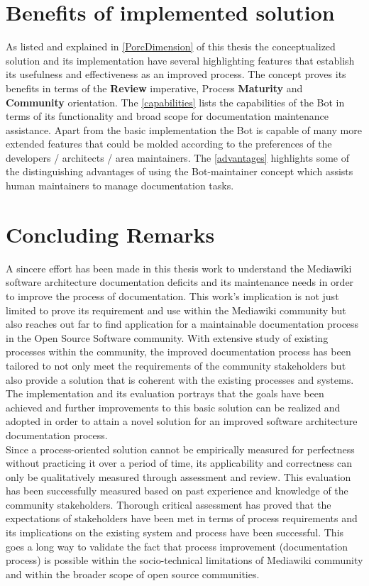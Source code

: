 \section{Benefits of implemented solution} 
\indent As listed and explained in \autoref{PorcDimension} of this thesis the conceptualized solution and its implementation have several highlighting features that establish its usefulness and effectiveness as an improved process. The concept proves its benefits in terms of the \textbf{Review} imperative, Process \textbf{Maturity} and \textbf{Community} orientation.
\newline \newline The \autoref{capabilities} lists the capabilities of the Bot in terms of its functionality and broad scope for documentation maintenance assistance. Apart from the basic implementation the Bot is capable of many more extended features that could be molded according to the preferences of the developers / architects / area maintainers. 	
\newline \newline The \autoref{advantages} highlights some of the distinguishing advantages of using the Bot-maintainer concept which assists human maintainers to manage documentation tasks.

\section{Concluding Remarks} 	
\indent A sincere effort has been made in this thesis work to understand the Mediawiki software architecture documentation deficits and its maintenance needs in order to improve the process of documentation. This work's implication is not just limited to prove its requirement and use within the Mediawiki community but also reaches out far to find application for a maintainable documentation process in the Open Source Software community. With extensive study of existing processes within the community, the improved documentation process has been tailored to not only meet the requirements of the community stakeholders but also provide a solution that is coherent with the existing processes and systems. The implementation and its evaluation portrays that the goals have been achieved and further improvements to this basic solution can be realized and adopted in order to attain a novel solution for an improved software architecture documentation process. 
\\\indent Since a process-oriented solution cannot be empirically measured for perfectness without practicing it over a period of time, its applicability and correctness can only be qualitatively measured through assessment and review. This evaluation has been successfully measured based on past experience and knowledge of the community stakeholders. Thorough critical assessment has proved that the expectations of stakeholders have been met in terms of process requirements and its implications on the existing system and process have been successful. This goes a long way to validate the fact that process improvement (documentation process) is possible within the socio-technical limitations of Mediawiki community and within the broader scope of open source communities.

